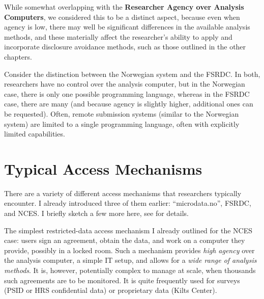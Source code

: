 While somewhat overlapping with the \textbf{Researcher Agency over Analysis Computers}, we considered this to be a distinct aspect, because even when agency is low, there may well be significant differences in the available analysis methods, and these materially affect the researcher's ability to apply and incorporate disclosure avoidance methods, such as those outlined in the other chapters. 

Consider the distinction between the Norwegian system and the FSRDC. In both, researchers have no control over the analysis computer, but in the Norwegian case, there is only one possible programming language, whereas in the FSRDC case, there are many (and because agency is slightly higher, additional ones can be requested). Often, remote submission systems (similar to the Norwegian system) are limited to a single programming language, often with explicitly limited capabilities. 

\section{Typical Access Mechanisms}
\label{sec:typical_access}

There are a variety of different access mechanisms that researchers typically encounter. I already introduced three of them earlier: ``microdata.no'', FSRDC, and NCES.  I briefly sketch a few more here, see \cite{shen_physically_2021} for details. 

The simplest restricted-data access mechanism I already outlined for the NCES case: users sign an agreement, obtain the data, and work on a computer they provide, possibly in a locked room. Such a mechanism provides \textit{high agency} over the analysis computer, a simple IT setup, and allows for a \textit{wide range of analysis methods}. It is, however, potentially complex to manage at scale, when thousands such agreements are to be monitored. It is quite frequently used for surveys (PSID or HRS confidential data) or  proprietary data (Kilts Center). 

